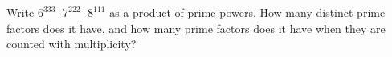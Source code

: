 Write $6^{333}\cdot7^{222}\cdot8^{111}$ as a product of prime powers. How many distinct prime factors does it have, and how many prime factors does it have when they are counted with multiplicity?
